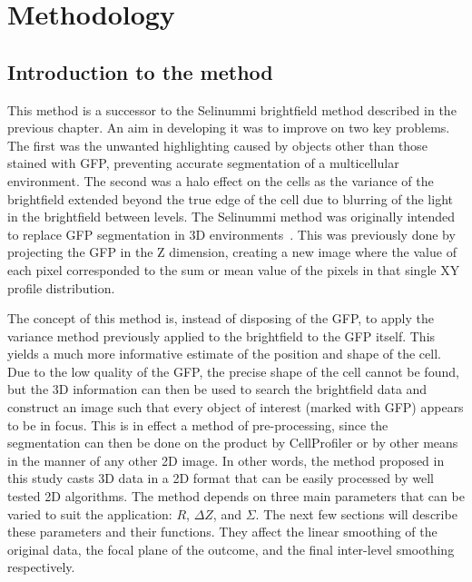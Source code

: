 
\chapter{Methodology}

\ifpdf
    \graphicspath{{Chapter4/Figs/Raster/}{Chapter4/Figs/PDF/}{Chapter4/Figs/}}
\else
    \graphicspath{{Chapter4/Figs/Vector/}{Chapter4/Figs/}}
\fi

\section{Introduction to the method}

This method is a successor to the Selinummi brightfield method described in the previous chapter. An aim in developing it was to improve on two key problems. The first was the unwanted highlighting caused by objects other than those stained with GFP, preventing accurate segmentation of a multicellular environment. The second was a halo effect on the cells as the variance of the brightfield extended beyond the true edge of the cell due to blurring of the light in the brightfield between levels. The Selinummi method was originally intended to replace GFP segmentation in 3D environments~\cite{Selinummi:09}. This was previously done by projecting the GFP in the Z dimension, creating a new image where the value of each pixel corresponded to the sum or mean value of the pixels in that single XY profile distribution.

The concept of this method is, instead of disposing of the GFP, to apply the variance method previously applied to the brightfield to the GFP itself. This yields a much more informative estimate of the position and shape of the cell. Due to the low quality of the GFP, the precise shape of the cell cannot be found, but the 3D information can then be used to search the brightfield data and construct an image such that every object of interest (marked with GFP) appears to be in focus. This is in effect a method of pre-processing, since the segmentation can then be done on the product by CellProfiler or by other means in the manner of any other 2D image. In other words, the method proposed in this study casts 3D data in a 2D format that can be easily processed by well tested 2D algorithms. The method depends on three main parameters that can be varied to suit the application: $R$, $\Delta Z$, and $\Sigma$. The next few sections will describe these parameters and their functions. They affect the linear smoothing of the original data, the focal plane of the outcome, and the final inter-level smoothing respectively.

